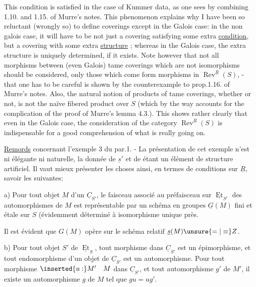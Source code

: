 This condition is satisfied in the case of Kummer data, as one sees by combining 1.10. and 1.15. of Murre's notes. This phenomenon explains why I have been so reluctant (wrongly so) to define  coverings except in the Galois case: in the non galois case, it will have to be not just a covering satisfying some extra \uline{condition}, but a covering with some extra \uline{structure} ; whereas in the Galois case, the extra structure is uniquely determined, if it exists. Note however that  not all morphisms  between (even Galois) tame coverings which are not isomorphisms should be considered, only those which come form morphisms in $\operatorname{Rev}^{\underline{R}}(S)$, - that one has to be careful is shown by the counterexample to prop.1.16. of Murre's notes. Also, the natural notion of products of tame  coverings, whether  or not, is not the naïve fibered product over $S$ (which by the way accounts for the complication of the proof of Murre's lemma 4.3.). This shows rather clearly that even in the Galois case, the consideration of the category $\operatorname{Rev}^{\underline{R}}(S)$ is indispensable for a good comprehension of what is really going on.

\uline{Remords} concernant l'exemple 3 du par.1. - La présentation de cet exemple n'est ni élégante ni naturelle, la donnée de $\underline{s}'$ et de \quad étant un élément de structure artificiel. Il vaut mieux présenter les choses ainsi, en termes de conditions sur $\underline{R}$, savoir les suivantes:

a) Pour tout objet $M$ d'un $\underline{C}_{S'}$, le faisceau  associé au préfaisceau sur $\underline{\operatorname{Et}}_{S'}$ des automorphismes de $M$ est  représentable par un schéma en groupes $\underline{G}(M)$ fini et étale sur $S$ (évidemment déterminé à isomorphisme unique près.

Il est évident que $G(M)$ opère sur le schéma relatif $\underline{s}(M)\unsure{=|\equiv}Z$.

b) Pour tout objet $S'$ de $\underline{\operatorname{Et}}_S$, tout morphisme  dans $\underline{C}_{S'}$ est un épimorphisme, et tout endomorphisme d'un objet de $\underline{C}_{S'}$ est un automorphisme. Pour tout morphisme $\inserted{u:}M'\quad M$ dans $\underline{C}_{S'}$, et tout automorphisme $g'$ de $M'$, il existe un automorphisme $g$ de $M$ tel que $gu=ug'$.

